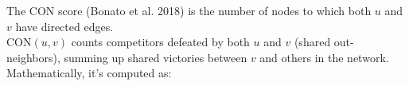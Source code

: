 \documentclass[preview]{standalone}
\begin{document}
The CON score (Bonato et al. 2018) is the number of nodes to which both $u$ and $v$ have directed edges.\\$\text{CON}(u, v)$ counts competitors defeated by both $u$ and $v$ (shared out-neighbors), summing up shared victories between $v$ and others in the network.\\Mathematically, it's computed as:\\
\end{document}
